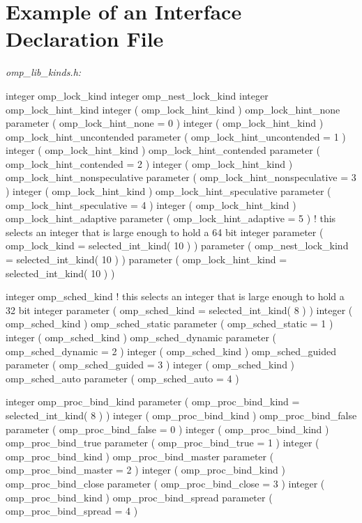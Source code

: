 \pagebreak
{\section{Example of an Interface Declaration  File}}
\label{sec:Example of an Interface Declaration include File}
\emph{omp\_lib\_kinds.h:}
{\small \begin{codepar}
     integer omp\_lock\_kind
     integer omp\_nest\_lock\_kind
     integer omp\_lock\_hint\_kind
     integer ( omp\_lock\_hint\_kind ) omp\_lock\_hint\_none
     parameter ( omp\_lock\_hint\_none = 0 )
     integer ( omp\_lock\_hint\_kind ) omp\_lock\_hint\_uncontended
     parameter ( omp\_lock\_hint\_uncontended = 1 )
     integer ( omp\_lock\_hint\_kind ) omp\_lock\_hint\_contended
     parameter ( omp\_lock\_hint\_contended = 2 )
     integer ( omp\_lock\_hint\_kind ) omp\_lock\_hint\_nonspeculative
     parameter ( omp\_lock\_hint\_nonspeculative = 3 )
     integer ( omp\_lock\_hint\_kind ) omp\_lock\_hint\_speculative
     parameter ( omp\_lock\_hint\_speculative = 4 )
     integer ( omp\_lock\_hint\_kind ) omp\_lock\_hint\_adaptive
     parameter ( omp\_lock\_hint\_adaptive = 5 )
! this selects an integer that is large enough to hold a 64 bit integer
     parameter ( omp\_lock\_kind = selected\_int\_kind( 10 ) )
     parameter ( omp\_nest\_lock\_kind = selected\_int\_kind( 10 ) )
     parameter ( omp\_lock\_hint\_kind = selected\_int\_kind( 10 ) )
     
     integer omp\_sched\_kind
! this selects an integer that is large enough to hold a 32 bit integer
     parameter ( omp\_sched\_kind = selected\_int\_kind( 8 ) )
     integer ( omp\_sched\_kind ) omp\_sched\_static
     parameter ( omp\_sched\_static = 1 )
     integer ( omp\_sched\_kind ) omp\_sched\_dynamic
     parameter ( omp\_sched\_dynamic = 2 )
     integer ( omp\_sched\_kind ) omp\_sched\_guided
     parameter ( omp\_sched\_guided = 3 )
     integer ( omp\_sched\_kind ) omp\_sched\_auto
     parameter ( omp\_sched\_auto = 4 )
     
     integer omp\_proc\_bind\_kind
     parameter ( omp\_proc\_bind\_kind = selected\_int\_kind( 8 ) )
     integer ( omp\_proc\_bind\_kind ) omp\_proc\_bind\_false
     parameter ( omp\_proc\_bind\_false = 0 )
     integer ( omp\_proc\_bind\_kind ) omp\_proc\_bind\_true
     parameter ( omp\_proc\_bind\_true = 1 )
     integer ( omp\_proc\_bind\_kind ) omp\_proc\_bind\_master
     parameter ( omp\_proc\_bind\_master = 2 )
     integer ( omp\_proc\_bind\_kind ) omp\_proc\_bind\_close
     parameter ( omp\_proc\_bind\_close = 3 )
     integer ( omp\_proc\_bind\_kind ) omp\_proc\_bind\_spread
     parameter ( omp\_proc\_bind\_spread = 4 )
\end{codepar}}


